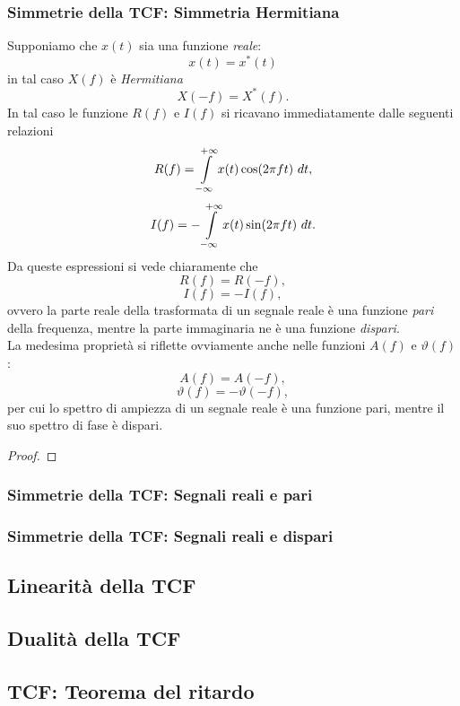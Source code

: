 \documentclass[12pt,oneside,openany]{memoir}
\numberwithin{equation}{subsection}
\newcommand{\dt}{\ dt}
\begin{document}
\subsubsection{Simmetrie della TCF: Simmetria Hermitiana}
Supponiamo che $x(t)$ sia una funzione \textit{reale}:
\[
	x(t) = x^*(t)
\]
in tal caso $X(f)$ \`e \textit{Hermitiana}
\[
	X(-f) = X^*(f).
\]
In tal caso le funzione $R(f)$ e $I(f)$ si ricavano immediatamente dalle seguenti relazioni
\[
	R(f) = \int\displaylimits_{-\infty}^{+\infty} x(t) \cos(2 \pi f t) \dt,
\]
\[
	I(f) = -\int\displaylimits_{-\infty}^{+\infty} x(t) \sin(2 \pi f t) \dt.
\]
Da queste espressioni si vede chiaramente che
\[
	R(f) = R(-f),
\]
\[
	I(f) = -I(f),
\]
ovvero la parte reale della trasformata di un segnale reale \`e una funzione \textit{pari} della frequenza, mentre la parte immaginaria ne \`e una funzione \textit{dispari}.\\
La medesima propriet\`a si riflette ovviamente anche nelle funzioni $A(f)$ e $\vartheta(f)$:
\[
	A(f) = A(-f),
\]
\[
	\vartheta(f) = - \vartheta(-f),
\]
per cui lo spettro di ampiezza di un segnale reale \`e una funzione pari, mentre il suo spettro di fase \`e dispari.
\begin{proof}

\end{proof}

\subsubsection{Simmetrie della TCF: Segnali reali e pari}


\subsubsection{Simmetrie della TCF: Segnali reali e dispari}


\newpage
\subsection{Linearit\`a della TCF}

\newpage
\subsection{Dualit\`a della TCF}

\newpage
\subsection{TCF: Teorema del ritardo}
\end{document}
